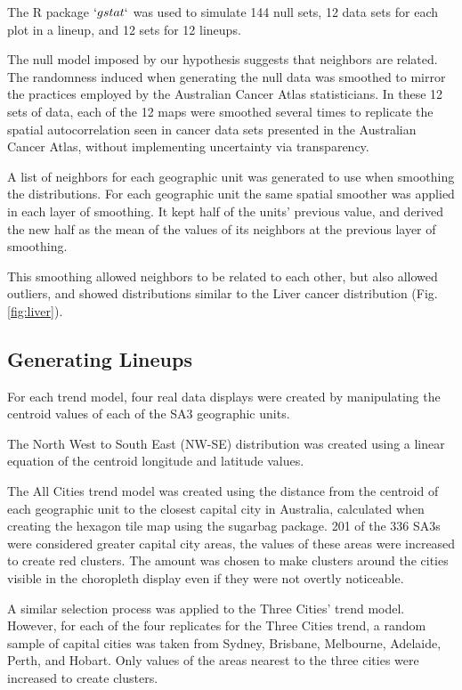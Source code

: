 \documentclass[12pt]{article}
\begin{document}
The R package \(`gstat`\) \citep{gstat} was used to simulate 144 null
sets, 12 data sets for each plot in a lineup, and 12 sets for 12
lineups.

The null model imposed by our hypothesis suggests that neighbors are
related. The randomness induced when generating the null data was
smoothed to mirror the practices employed by the Australian Cancer Atlas
statisticians. In these 12 sets of data, each of the 12 maps were
smoothed several times to replicate the spatial autocorrelation seen in
cancer data sets presented in the Australian Cancer Atlas, without
implementing uncertainty via transparency.

A list of neighbors for each geographic unit was generated to use when
smoothing the distributions. For each geographic unit the same spatial
smoother was applied in each layer of smoothing. It kept half of the
units' previous value, and derived the new half as the mean of the
values of its neighbors at the previous layer of smoothing.

This smoothing allowed neighbors to be related to each other, but also
allowed outliers, and showed distributions similar to the Liver cancer
distribution (Fig. \ref{fig:liver}).

\subsection{Generating Lineups}
\label{sec:gld}

For each trend model, four real data displays were created by
manipulating the centroid values of each of the SA3 geographic units.

The North West to South East (NW-SE) distribution was created using a
linear equation of the centroid longitude and latitude values.

The All Cities trend model was created using the distance from the
centroid of each geographic unit to the closest capital city in
Australia, calculated when creating the hexagon tile map using the
sugarbag \citep{sugarbag} package. 201 of the 336 SA3s were considered
greater capital city areas, the values of these areas were increased to
create red clusters. The amount was chosen to make clusters around the
cities visible in the choropleth display even if they were not overtly
noticeable.

A similar selection process was applied to the Three Cities' trend
model. However, for each of the four replicates for the Three Cities
trend, a random sample of capital cities was taken from Sydney,
Brisbane, Melbourne, Adelaide, Perth, and Hobart. Only values of the
areas nearest to the three cities were increased to create clusters.
\end{document}
